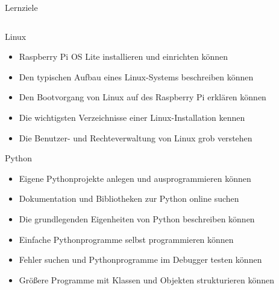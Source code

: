 {
\scriptsize

\begin{frame}{Lernziele}
    \begin{columns}
        \begin{column}{.7\textwidth}
            \begin{block}{Linux}
                \begin{itemize}
                    \item Raspberry Pi OS Lite installieren und einrichten können
                    \item Den typischen Aufbau eines Linux-Systems beschreiben können
                    \item Den Bootvorgang von Linux auf des Raspberry Pi erklären können
                    \item Die wichtigsten Verzeichnisse einer Linux-Installation kennen
                    \item Die Benutzer- und Rechteverwaltung von Linux grob verstehen
                \end{itemize}
            \end{block}

            \begin{block}{Python}
                \begin{itemize}
                    \item Eigene Pythonprojekte anlegen und ausprogrammieren können
                    \item Dokumentation und Bibliotheken zur Python online suchen
                    \item Die grundlegenden Eigenheiten von Python beschreiben können
                    \item Einfache Pythonprogramme selbst programmieren können
                    \item Fehler suchen und Pythonprogramme im Debugger testen können
                    \item Größere Programme mit Klassen und Objekten strukturieren können
                \end{itemize}
            \end{block}
        \end{column}


\end{columns}
\end{frame}}
